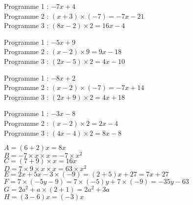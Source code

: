 \documentclass[a4paper,11pt,fleqn]{article}		%
\begin{document}
\setcounter{exo}{0}
\vfill
\begin{correction}
\begin{multicols}{2}
%
%


Programme 1 : $-7 x +4$\\
Programme 2 : $(x +3)\times (-7)= -7  x  -21 $\\
Programme 3 : $( 8 x -2 )\times 2= 16 x -4$


Programme 1 : $-5 x +9$\\
Programme 2 : $(x -2)\times 9= 9  x  -18 $\\
Programme 3 : $( 2 x -5 )\times 2= 4 x -10$


Programme 1 : $-8 x +2$\\
Programme 2 : $(x -2)\times (-7)= -7  x  +14 $\\
Programme 3 : $( 2 x +9 )\times 2= 4 x +18$


Programme 1 : $-3 x -8$\\
Programme 2 : $(x -2)\times 2= 2  x  -4 $\\
Programme 3 : $( 4 x -4 )\times 2= 8 x -8$



$A=(6  +2) x=8 x$\\
$B=-7 \times x\times x=-7 \times x^2$\\
$C=(7 +9) \times x=16  x$\\
$D=7\times 9\times x\times x=63\times x^2$\\
$E= 2  x +5 x -3\times (-9) = (2  +5) x +27 = 7 x +27 $\\
$F=7 \times (-5y -9)  =7 \times (-5)y +7 \times (-9)
 =-35y -63 $\\
$G=2 a^2+a\times (2+ 1)=2 a^2+3a$\\
$H= (3 -6)x = (-3)x$


\end{multicols}
\end{correction}
\end{document}
